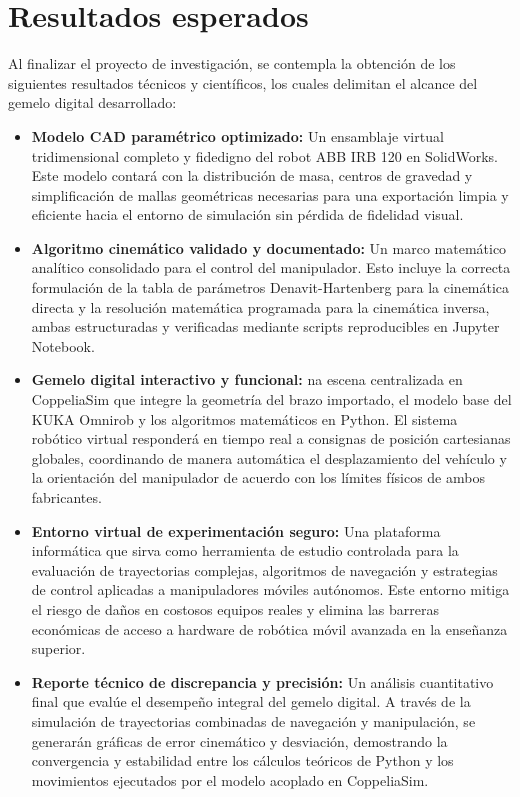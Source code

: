\documentclass[11pt,oneside]{report}
\begin{document}
\chapter{Resultados esperados}

Al finalizar el proyecto de investigación, se contempla la obtención de los siguientes resultados técnicos y científicos, los cuales delimitan el alcance del gemelo digital desarrollado:

\begin{itemize}
  \item \textbf{Modelo CAD paramétrico optimizado:} Un ensamblaje virtual tridimensional completo y fidedigno del robot ABB IRB 120 en SolidWorks. Este modelo contará con la distribución de masa, centros de gravedad y simplificación de mallas geométricas necesarias para una exportación limpia y eficiente hacia el entorno de simulación sin pérdida de fidelidad visual.
  \item \textbf{Algoritmo cinemático validado y documentado:} Un marco matemático analítico consolidado para el control del manipulador. Esto incluye la correcta formulación de la tabla de parámetros Denavit-Hartenberg para la cinemática directa y la resolución matemática programada para la cinemática inversa, ambas estructuradas y verificadas mediante scripts reproducibles en Jupyter Notebook.
  \item \textbf{Gemelo digital interactivo y funcional:} na escena centralizada en CoppeliaSim que integre la geometría del brazo importado, el modelo base del KUKA Omnirob y los algoritmos matemáticos en Python. El sistema robótico virtual responderá en tiempo real a consignas de posición cartesianas globales, coordinando de manera automática el desplazamiento del vehículo y la orientación del manipulador de acuerdo con los límites físicos de ambos fabricantes.
  \item \textbf{Entorno virtual de experimentación seguro:} Una plataforma informática que sirva como herramienta de estudio controlada para la evaluación de trayectorias complejas, algoritmos de navegación y estrategias de control aplicadas a manipuladores móviles autónomos. Este entorno mitiga el riesgo de daños en costosos equipos reales y elimina las barreras económicas de acceso a hardware de robótica móvil avanzada en la enseñanza superior.
  \item \textbf{Reporte técnico de discrepancia y precisión:} Un análisis cuantitativo final que evalúe el desempeño integral del gemelo digital. A través de la simulación de trayectorias combinadas de navegación y manipulación, se generarán gráficas de error cinemático y desviación, demostrando la convergencia y estabilidad entre los cálculos teóricos de Python y los movimientos ejecutados por el modelo acoplado en CoppeliaSim.
\end{itemize}
\end{document}
